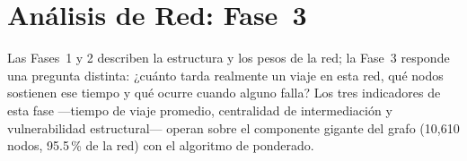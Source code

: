\section{Análisis de Red: Fase~3}
\label{sec:fase3-analisis-red}

Las Fases~1 y 2 describen la estructura y los pesos de la red; la Fase~3
responde una pregunta distinta: ¿cuánto tarda realmente un viaje en esta red,
qué nodos sostienen ese tiempo y qué ocurre cuando alguno falla? Los tres
indicadores de esta fase —tiempo de viaje promedio, centralidad de
intermediación y vulnerabilidad estructural— operan sobre el componente gigante
del grafo (10{,}610 nodos, 95.5\,\% de la red) con el algoritmo de \dijkstra{}
ponderado.




